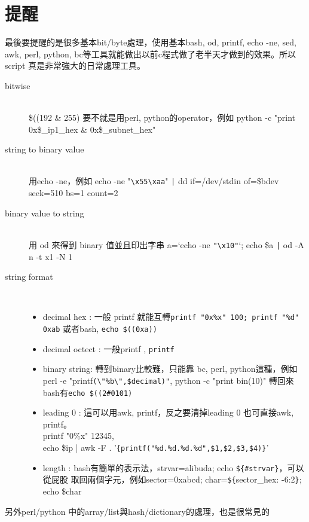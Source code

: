 \section{提醒}
最後要提醒的是很多基本bit/byte處理，使用基本bash, od, printf, echo -ne, sed,
awk, perl, python, bc等工具就能做出以前c程式做了老半天才做到的效果。所以script
真是非常強大的日常處理工具。
\begin{description}
  \item [bitwise] \hfill \\
    \$((192 \& 255) 要不就是用perl, python的operator，例如
    python -c "print 0x\$\_ip1\_hex \& 0x\$\_subnet\_hex"
  \item [string to binary value] \hfill \\
    用echo -ne，例如
    echo -ne "\verb=\x55\xaa=" \verb=|= dd if=/dev/stdin of=\$bdev seek=510 bs=1 count=2
  \item [binary value to string] \hfill \\
    用 od 來得到 binary 值並且印出字串
    a=`echo -ne \verb="\x10"=`; echo \$a \verb=|= od -A n -t x1 -N 1
  \item [string format] \hfill \\
  \begin{itemize}
    \item decimal hex : 一般 printf 就能互轉\verb=printf "0x%x" 100; printf "%d" 0xab= 
      或者bash, \verb=echo $((0xa))=
    \item decimal octect : 一般printf , \verb=printf=
    \item binary string: 轉到binary比較難，只能靠 bc, perl, python這種，例如
      perl -e "printf\verb=(\"%b\",$decimal)"=, python -c "print bin(10)"
      轉回來bash有\verb=echo $((2#0101)=
    \item leading 0 : 這可以用awk, printf，反之要清掉leading 0 也可直接awk, printf。\\
      printf "0\%x" 12345, \\
      echo \$ip | awk -F . '\verb={printf("%d.%d.%d.%d",$1,$2,$3,$4)}='
    \item length : bash有簡單的表示法，strvar=alibuda; echo \verb=${#strvar}=，可以從屁股
      取回兩個字元，例如sector=0xabcd; char=\verb=${=sector\_hex: -6:2\verb=}=; echo \$char
  \end{itemize}
\end{description}
另外perl/python 中的array/list與hash/dictionary的處理，也是很常見的
